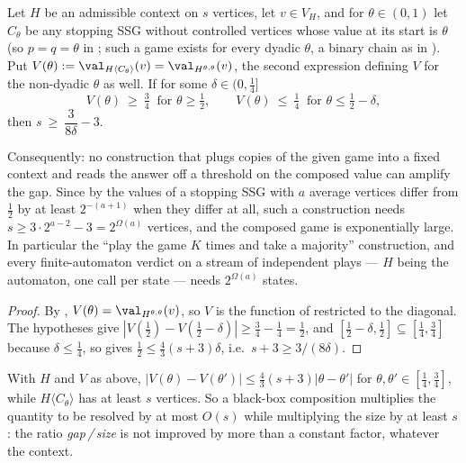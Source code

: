 \begin{theorem}\label{thm:fs16-noamp}
Let $H$ be an admissible context on $s$ vertices, let $v\in V_H$, and for
$\theta\in(0,1)$ let $C_\theta$ be any stopping SSG without controlled vertices
whose value at its start is $\theta$ (so $p=q=\theta$ in
; such a game exists for every dyadic $\theta$, a binary
chain as in ). Put
$V(\theta):=\val_{H\langle C_\theta\rangle}(v)=\val_{H^{\theta,\theta}}(v)$, the
second expression defining $V$ for the non-dyadic $\theta$ as well.
If for some $\delta\in(0,\tfrac14]$
\[
  V(\theta)\ \ge\ \tfrac34\ \text{ for }\theta\ge\tfrac12,
  \qquad
  V(\theta)\ \le\ \tfrac14\ \text{ for }\theta\le\tfrac12-\delta,
\]
then $s\ \ge\ \dfrac{3}{8\delta}-3$.

Consequently: no construction that plugs copies of the given game into a fixed
context and reads the answer off a threshold on the composed value can amplify
the gap. Since by  the values of a stopping SSG
with $a$ average vertices differ from $\tfrac12$ by at least $2^{-(a+1)}$ when
they differ at all, such a construction needs
$s\ge 3\cdot2^{a-2}-3=2^{\Omega(a)}$ vertices, and the composed game is
exponentially large. In particular the ``play the game $K$ times and take a
majority'' construction, and every finite-automaton verdict on a stream of
independent plays --- $H$ being the automaton, one call per state --- needs
$2^{\Omega(a)}$ states.
\end{theorem}

\begin{proof}
By , $V(\theta)=\val_{H^{\theta,\theta}}(v)$, so $V$ is the
function of  restricted to the diagonal. The hypotheses give
$|V(\tfrac12)-V(\tfrac12-\delta)|\ge\tfrac34-\tfrac14=\tfrac12$, and
$[\tfrac12-\delta,\tfrac12]\subseteq[\tfrac14,\tfrac34]$ because
$\delta\le\tfrac14$, so  gives
$\tfrac12\le\tfrac43(s+3)\delta$, i.e.\ $s+3\ge 3/(8\delta)$.
\end{proof}

\begin{corollary}\label{cor:fs16-gapratio}
With $H$ and $V$ as above, $|V(\theta)-V(\theta')|\le\tfrac43(s+3)|\theta-\theta'|$
for $\theta,\theta'\in[\tfrac14,\tfrac34]$, while $H\langle C_\theta\rangle$ has
at least $s$ vertices. So a black-box composition multiplies the quantity to be
resolved by at most $O(s)$ while multiplying the size by at least $s$: the ratio
\emph{gap\,/\,size} is not improved by more than a constant factor, whatever the
context.
\end{corollary}

